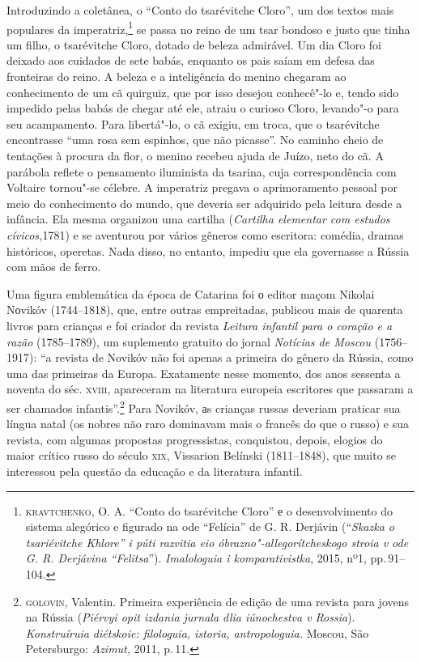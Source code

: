 Introduzindo a coletânea, o ``Conto do tsarévitche
Cloro'', um dos textos mais populares da imperatriz,\footnote{\textsc{kravtchenko},
  O. A. ``Conto do tsarévitche Cloro'' е o desenvolvimento do sistema
  alegórico e figurado na ode ``Felícia'' de G. R. Derjávin
  (``\emph{Skazka o tsariévitche Khlore'' i púti razvitia eio
  óbrazno"-allegorítcheskogo stroia v ode G. R. Derjávina ``Felitsa}'').
  \emph{Imalologuia i komparativistka}, 2015, nº1, pp.\,91--104.} se passa
no reino de um tsar bondoso e justo que tinha um filho, o tsarévitche
Cloro, dotado de beleza admirável. Um dia Cloro foi deixado aos cuidados
de sete babás, enquanto os pais saíam em defesa das fronteiras do reino.
A beleza e a inteligência do menino chegaram ao conhecimento de um cã
quirguiz, que por isso desejou conhecê"-lo e, tendo sido impedido pelas
babás de chegar até ele, atraiu o curioso Cloro, levando"-o para seu
acampamento. Para libertá"-lo, o cã exigiu, em troca, que o tsarévitche
encontrasse ``uma rosa sem espinhos, que não picasse''. No caminho cheio
de tentações à procura da flor, o menino recebeu ajuda de Juízo, neto do
cã. A parábola reflete o pensamento iluminista da tsarina, cuja
correspondência com Voltaire tornou"-se célebre. A imperatriz pregava o
aprimoramento pessoal por meio do conhecimento do mundo, que deveria ser
adquirido pela leitura desde a infância. Ela mesma organizou uma
cartilha (\emph{Cartilha elementar com estudos cívicos,}1781) e se
aventurou por vários gêneros como escritora: comédia, dramas históricos,
operetas. Nada disso, no entanto, impediu que ela governasse a Rússia
com mãos de ferro.

Uma figura emblemática da época de Catarina foi о editor maçom Nikolai
Nоvikóv (1744--1818), que, entre outras empreitadas, publicou mais de
quarenta livros para crianças e foi criador da revista \emph{Leitura
infantil para o coração e a razão} (1785--1789), um suplemento gratuito
do jornal \emph{Notícias de Moscou} (1756--1917): ``a revista de Novikóv
não foi apenas a primeira do gênero da Rússia, como uma das primeiras da
Europa. Exatamente nesse momento, dos anos sessenta a noventa do séc.
\textsc{xviii}, apareceram na literatura europeia escritores que passaram a ser
chamados infantis''.\footnote{\textsc{golovin}, Valentin. Primeira experiência de
  edição de uma revista para jovens na Rússia (\emph{Piérvyi opit
  izdania jurnala dlia iúnochestva v Rossia}). \emph{Konstruíruia
  diétskoie: filologuia, istoria, antropologuia.} Moscou, São
  Petersburgo: \emph{Azimut,} 2011, p.\,11.} Para Novikóv, аs crianças
russas deveriam praticar sua língua natal (os nobres não raro dominavam
mais o francês do que o russo) e sua revista, com algumas propostas
progressistas, conquistou, depois, elogios do maior crítico
russo do século \textsc{xix}, Vissarion Belínski (1811--1848), que muito se
interessou pela questão da educação e da literatura infantil.

